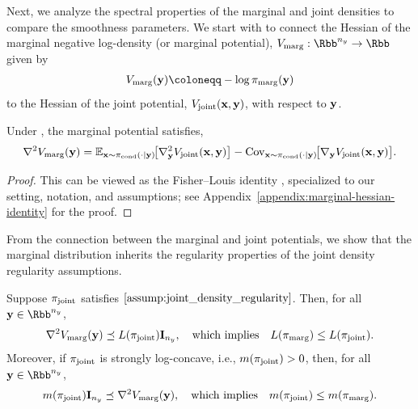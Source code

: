 \documentclass[onefignum,onetabnum]{siamonline250211}
\newcommand{\bfI}{{\bf I}}
\newcommand{\bfx}{{\bf x}}
\newcommand{\bfy}{{\bf y}}
\newcommand{\ny}{{n_{y}}}
\newcommand{\pjoint}{\pi_{\rm joint}}
\newcommand{\pcond}{\pi_{\rm cond}}
\newcommand{\pmarg}{\pi_{\rm marg}}
\begin{document}
Next, we analyze the spectral properties of the marginal and joint densities to compare the smoothness parameters. 
%
%
%
%
%
%
We start with  to connect the Hessian of the marginal negative log-density (or marginal potential), $V_{\rm marg}: \Rbb^\ny \to \Rbb$ given by
    \begin{align}
     \label{def:Jmarg}
        V_{\rm marg}(\bfy) \coloneqq -\log \pmarg(\bfy)
    \end{align}
to the Hessian of the joint potential, $V_{\rm joint}(\bfx, \bfy)$, with respect to $\bfy$.


\begin{lemma}
  \label{lem:marginal-hessian-identity}
  Under , the marginal potential satisfies,
  \begin{equation}
    \label{eq:marginal-hessian-identity}
    \nabla^2 V_{\rm marg}(\bfy)
    = \mathbb{E}_{\bfx \sim \pcond(\cdot \mid\bfy)}\!\bigl[\nabla_{\bfy}^2 V_{\rm joint}(\bfx,\bfy)\bigr]
    - \operatorname{Cov}_{\bfx\sim \pcond(\cdot \mid\bfy)}\!\bigl[\nabla_{\bfy} V_{\rm joint}(\bfx,\bfy)\bigr].
  \end{equation}
\end{lemma}
\begin{proof}
    This can be viewed as the Fisher--Louis identity \cite[Proposition~10.1.6]{cappe_inference_2005}, specialized to our setting, notation, and assumptions; see Appendix~\ref{appendix:marginal-hessian-identity} for the proof.
\end{proof}

From the connection between the marginal and joint potentials,  we show that the marginal distribution inherits the regularity properties of the joint density regularity assumptions.

\begin{proposition}
  \label{prop:marginal-hessian}
  Suppose $\pjoint$ satisfies $\Cref{assump:joint_density_regularity}$.
  Then, for all $\bfy\in \Rbb^\ny$, 
  \begin{align}\label{eq:implication_L}
      \nabla^2 V_{\rm marg}(\bfy) \preceq L(\pjoint) \bfI_{\ny}, \quad \text{which implies} \quad  L(\pmarg) \leq L(\pjoint).
  \end{align}
  Moreover, if $\pjoint$ is strongly log-concave, i.e., $m(\pjoint) > 0$, then, for all $\bfy\in \Rbb^\ny$, 
  \begin{align}\label{eq:implication_m}
      m(\pjoint) \bfI_{\ny} \preceq \nabla^2 V_{\rm marg}(\bfy), \quad \text{which implies} \quad m(\pjoint) \leq m(\pmarg).
  \end{align}
\end{proposition}
\end{document}
